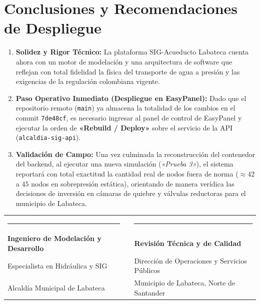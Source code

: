\documentclass[11pt,letterpaper]{article}
\begin{document}
\section{Conclusiones y Recomendaciones de Despliegue}

\begin{enumerate}
    \item \textbf{Solidez y Rigor Técnico:} La plataforma SIG-Acueducto Labateca cuenta ahora con un motor de modelación y una arquitectura de software que reflejan con total fidelidad la física del transporte de agua a presión y las exigencias de la regulación colombiana vigente.
    \item \textbf{Paso Operativo Inmediato (Despliegue en EasyPanel):}
    Dado que el repositorio remoto (\texttt{main}) ya almacena la totalidad de los cambios en el commit \texttt{7de48cf}, es necesario ingresar al panel de control de EasyPanel y ejecutar la orden de \textbf{«Rebuild / Deploy»} sobre el servicio de la API (\texttt{alcaldia-sig-api}).
    \item \textbf{Validación de Campo:}
    Una vez culminada la reconstrucción del contenedor del backend, al ejecutar una nueva simulación (\textit{«Prueba 3»}), el sistema reportará con total exactitud la cantidad real de nodos fuera de norma ($\approx 42$ a $45$ nodos en sobrepresión estática), orientando de manera verídica las decisiones de inversión en cámaras de quiebre y válvulas reductoras para el municipio de Labateca.
\end{enumerate}

\vspace{2.5em}
\noindent
\begin{tabularx}{\textwidth}{XcX}
    \rule{6cm}{0.4pt} & \hspace{1cm} & \rule{6cm}{0.4pt} \\
    \textbf{Ingeniero de Modelación y Desarrollo} & & \textbf{Revisión Técnica y de Calidad} \\
    Especialista en Hidráulica y SIG & & Dirección de Operaciones y Servicios Públicos \\
    Alcaldía Municipal de Labateca & & Municipio de Labateca, Norte de Santander
\end{tabularx}
\end{document}
